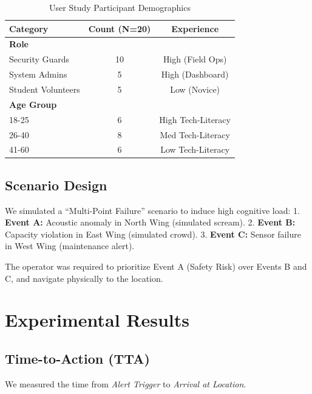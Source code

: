 \documentclass[conference]{IEEEtran}
\begin{document}
\begin{table}[htbp]
\caption{User Study Participant Demographics}
\begin{center}
\begin{tabular}{lcc}
\toprule
\textbf{Category} & \textbf{Count (N=20)} & \textbf{Experience} \\
\midrule
\textbf{Role} & & \\
Security Guards & 10 & High (Field Ops) \\
System Admins & 5 & High (Dashboard) \\
Student Volunteers & 5 & Low (Novice) \\
\midrule
\textbf{Age Group} & & \\
18-25 & 6 & High Tech-Literacy \\
26-40 & 8 & Med Tech-Literacy \\
41-60 & 6 & Low Tech-Literacy \\
\bottomrule
\end{tabular}
\end{center}
\label{tab:participants}
\end{table}

\subsection{Scenario Design}
We simulated a ``Multi-Point Failure'' scenario to induce high cognitive load:
1.  \textbf{Event A:} Acoustic anomaly in North Wing (simulated scream).
2.  \textbf{Event B:} Capacity violation in East Wing (simulated crowd).
3.  \textbf{Event C:} Sensor failure in West Wing (maintenance alert).

The operator was required to prioritize Event A (Safety Risk) over Events B and C, and navigate physically to the location.

\section{Experimental Results}

\subsection{Time-to-Action (TTA)}
We measured the time from \textit{Alert Trigger} to \textit{Arrival at Location}.
\end{document}
